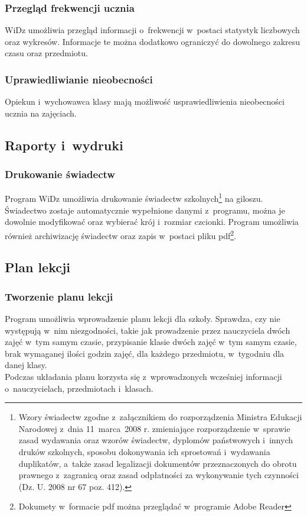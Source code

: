 \documentclass[12pt,leqno,twoside]{mwart}
\begin{document}
\subsubsection{Przegląd frekwencji ucznia}
\noindent WiDz umożliwia przegląd informacji o~frekwencji w~postaci statystyk liczbowych oraz wykresów. Informacje te można dodatkowo ograniczyć do dowolnego zakresu czasu oraz przedmiotu.

\subsubsection{Uprawiedliwianie nieobecności}
\noindent Opiekun i~wychowawca klasy mają możliwość usprawiedliwienia nieobecności ucznia na zajęciach.

\subsection{Raporty i~wydruki}
\subsubsection{Drukowanie świadectw} 
\noindent Program WiDz umożliwia drukowanie świadectw szkolnych\footnote{Wzory świadectw zgodne z~załącznikiem do rozporządzenia Ministra Edukacji Narodowej z~dnia 11~marca~2008 r. zmieniające rozporządzenie w~sprawie zasad wydawania oraz wzorów świadectw, dyplomów państwowych i~innych druków szkolnych, sposobu dokonywania ich sprostowań i~wydawania duplikatów, a~także zasad legalizacji dokumentów przeznaczonych do obrotu prawnego z~zagranicą oraz zasad odpłatności za wykonywanie tych czynności (Dz. U. 2008 nr 67 poz. 412).} na giloszu. Świadectwo zostaje automatycznie wypełnione danymi z~programu, można je dowolnie modyfikować oraz wybierać krój i~rozmiar czcionki. Program umożliwia również archiwizację świadectw oraz zapis w~postaci pliku pdf\footnote{Dokumety w~formacie pdf można przeglądać w~programie Adobe Reader}.

\subsection{Plan lekcji}
\subsubsection{Tworzenie planu lekcji}
\noindent Program umożliwia wprowadzenie planu lekcji dla szkoły. Sprawdza, czy nie występują w~nim niezgodności, takie jak prowadzenie przez nauczyciela dwóch zajęć w~tym samym czasie, przypisanie klasie dwóch zajęć w~tym samym czasie, brak wymaganej ilości godzin zajęć, dla każdego przedmiotu, w~tygodniu dla danej klasy.\\
\indent Podczas układania planu korzysta się z~wprowadzonych wcześniej informacji o~nauczycielach, przedmiotach i~klasach.
\end{document}
